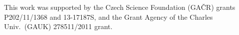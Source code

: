 \documentclass{itatnew}
\begin{document}
This work was supported by the Czech Science Foundation (GA\v{C}R) grants \hbox{P202/11/1368} and \hbox{13-17187S}, and the Grant Agency of the Charles Univ.\ (GAUK) \hbox{278511/2011} grant. 

%
%


% 
% 
% 
% 
% 
\end{document}
